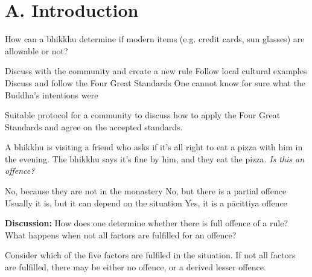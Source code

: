 \chapter{A. Introduction}
\renewcommand*{\theChapterTitle}{A. Introduction}

\begin{exam}{\autoExamName}

\begin{problem}

  How can a bhikkhu determine if modern items (e.g. credit cards, sun glasses) are allowable or not?

  \bigskip

  \begin{answers}{1}
    \bChoices
     Discuss with the community and create a new rule\eAns
     Follow local cultural examples\eAns
     Discuss and follow the Four Great Standards\eAns
     One cannot know for sure what the Buddha's intentions were\eAns
    \eChoices
  \end{answers}

  \begin{solution}
    Suitable protocol for a community to discuss how to apply the Four Great
    Standards and agree on the accepted standards.
  \end{solution}

\end{problem}

\problemDivide

\begin{problem}

  A bhikkhu is visiting a friend who asks if it's all right to eat a pizza with
  him in the evening. The bhikkhu says it's fine by him, and they eat the pizza.
  \emph{Is this an offence?}

  \bigskip

  \begin{answers}{1}
    \bChoices
     No, because they are not in the monastery\eAns
     No, but there is a partial offence\eAns
     Usually it is, but it can depend on the situation\eAns
     Yes, it is a pācittiya offence\eAns
    \eChoices
  \end{answers}

  \bigskip

  \textbf{Discussion:} How does one determine whether there is full offence of a
  rule? What happens when not all factors are fulfilled for an offence?

  \begin{solution}
    Consider which of the five factors are fulfiled in the situation. If not all
    factors are fulfilled, there may be either no offence, or a derived lesser
    offence.
  \end{solution}


\end{problem}
\end{exam}
